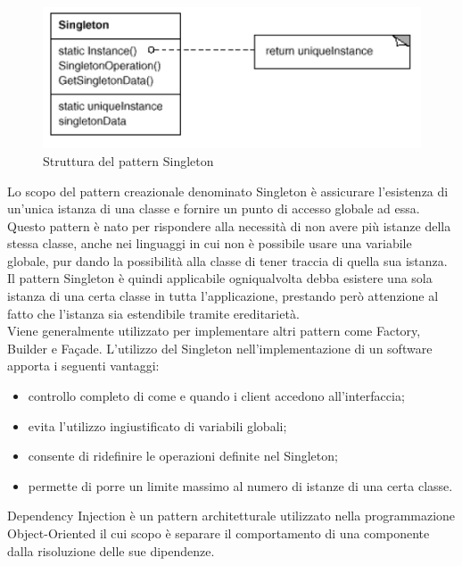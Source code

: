 		\begin{figure}[H]\centering
        \includegraphics[scale=0.7]{SpecificaTecnica/Pics/Singleton}
        \caption{Struttura del pattern Singleton}
		\end{figure}
		Lo scopo del pattern creazionale denominato Singleton è 
		assicurare l'esistenza di un'unica istanza di una classe e fornire
		un punto di accesso globale ad essa.\\
		Questo pattern è nato per rispondere alla necessità di non avere più
		istanze della stessa classe, anche nei linguaggi in cui non è possibile 
		usare una variabile globale, pur dando la possibilità alla classe di
		tener traccia di quella sua istanza.\\
		Il pattern Singleton è quindi applicabile ogniqualvolta debba esistere una 
		sola istanza di una certa classe in tutta l'applicazione, prestando però attenzione 
		al fatto che l'istanza sia estendibile tramite ereditarietà.\\
		Viene generalmente utilizzato per implementare altri pattern come Factory, 
		Builder e Façade.
		L'utilizzo del Singleton nell'implementazione di un software apporta i seguenti 
		vantaggi:
		\begin{itemize}
		\item controllo completo di come e quando i client accedono all'interfaccia;
		\item evita l'utilizzo ingiustificato di variabili globali;
		\item consente di ridefinire le operazioni definite nel Singleton;
		\item permette di porre un limite massimo al numero di istanze di una certa classe.
		\end{itemize}
	 \label{app:dependencyinjection}
Dependency Injection è un pattern architetturale utilizzato nella programmazione Object-Oriented il cui scopo è separare il comportamento di una componente dalla risoluzione delle sue dipendenze. \\
